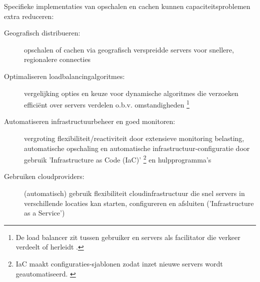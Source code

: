 Specifieke implementaties van opschalen en cachen kunnen capaciteitsproblemen
extra reduceren:

\begin{description}
    \item [Geografisch distribueren:] opschalen of cachen via
    geografisch verspreidde servers voor snellere, regionalere connecties
    \cite{sivasubramanian2007analysis, chenhao2017mitigating,
    colajanni1998dynamic}
    
    \item [Optimaliseren loadbalancingalgoritmes:] vergelijking opties 
    en keuze voor dynamische algoritmes die verzoeken efficiënt over
    servers verdelen o.b.v. omstandigheden
    \cite{mourad1997scalable, zhou2023comparative, amazon2023whatisload}
    \footnote{De load balancer zit tussen gebruiker en servers als
    facilitator die verkeer verdeelt of herleidt \cite{amazon2023whatisload}.}

    \item [Automatiseren infrastructuurbeheer en goed monitoren:] vergroting
    flexibiliteit/reactiviteit door extensieve monitoring belasting,
    automatische opschaling en automatische infrastructuur-configuratie
    door gebruik 'Infrastructure as Code (IaC)'
    \footnote{IaC maakt configuraties-sjablonen zodat inzet nieuwe
    servers wordt geautomatiseerd. \cite{microsoft2023wat}}
    en hulpprogramma's \cite{microsoft2023wat}
    
    \item [Gebruiken cloudproviders:] (automatisch) gebruik flexibiliteit
    cloudinfrastructuur die snel
    servers in verschillende locaties
    kan starten, configureren en afsluiten ('Infrastructure as a Service') 
    \cite{microsoft2023wat, gandhi2018modeldriven, hwang2014scaleout,
    chenhao2017mitigating}

\end{description}





